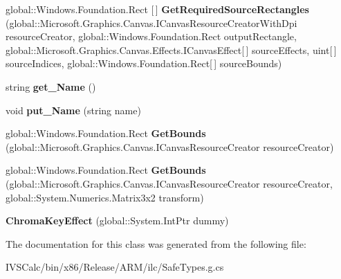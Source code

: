 \begin{DoxyCompactItemize}
\item 
\mbox{\label{class_microsoft_1_1_graphics_1_1_canvas_1_1_effects_1_1_chroma_key_effect_a9b6343722558ea8ae9a5c5be21c65e83}} 
global\+::\+Windows.\+Foundation.\+Rect \mbox{[}$\,$\mbox{]} {\bfseries Get\+Required\+Source\+Rectangles} (global\+::\+Microsoft.\+Graphics.\+Canvas.\+I\+Canvas\+Resource\+Creator\+With\+Dpi resource\+Creator, global\+::\+Windows.\+Foundation.\+Rect output\+Rectangle, global\+::\+Microsoft.\+Graphics.\+Canvas.\+Effects.\+I\+Canvas\+Effect\mbox{[}$\,$\mbox{]} source\+Effects, uint\mbox{[}$\,$\mbox{]} source\+Indices, global\+::\+Windows.\+Foundation.\+Rect\mbox{[}$\,$\mbox{]} source\+Bounds)
\item 
\mbox{\label{class_microsoft_1_1_graphics_1_1_canvas_1_1_effects_1_1_chroma_key_effect_aa040ca93f94a66acc94c7698971c6277}} 
string {\bfseries get\+\_\+\+Name} ()
\item 
\mbox{\label{class_microsoft_1_1_graphics_1_1_canvas_1_1_effects_1_1_chroma_key_effect_ab014ca503eb8dab9646c6fab8f676305}} 
void {\bfseries put\+\_\+\+Name} (string name)
\item 
\mbox{\label{class_microsoft_1_1_graphics_1_1_canvas_1_1_effects_1_1_chroma_key_effect_a03167f851f5b7793e8807c26e13c1d92}} 
global\+::\+Windows.\+Foundation.\+Rect {\bfseries Get\+Bounds} (global\+::\+Microsoft.\+Graphics.\+Canvas.\+I\+Canvas\+Resource\+Creator resource\+Creator)
\item 
\mbox{\label{class_microsoft_1_1_graphics_1_1_canvas_1_1_effects_1_1_chroma_key_effect_a2dbb49673b790793696c5058e4b09c70}} 
global\+::\+Windows.\+Foundation.\+Rect {\bfseries Get\+Bounds} (global\+::\+Microsoft.\+Graphics.\+Canvas.\+I\+Canvas\+Resource\+Creator resource\+Creator, global\+::\+System.\+Numerics.\+Matrix3x2 transform)
\item 
\mbox{\label{class_microsoft_1_1_graphics_1_1_canvas_1_1_effects_1_1_chroma_key_effect_a6886e18f02ffbd669e76848348cee1fd}} 
{\bfseries Chroma\+Key\+Effect} (global\+::\+System.\+Int\+Ptr dummy)
\end{DoxyCompactItemize}


The documentation for this class was generated from the following file\+:\begin{DoxyCompactItemize}
\item 
I\+V\+S\+Calc/bin/x86/\+Release/\+A\+R\+M/ilc/Safe\+Types.\+g.\+cs\end{DoxyCompactItemize}
